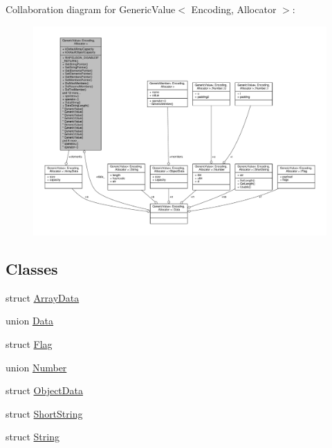 Collaboration diagram for Generic\+Value$<$ Encoding, Allocator $>$\+:
\nopagebreak
\begin{figure}[H]
\begin{center}
\leavevmode
\includegraphics[width=350pt]{classGenericValue__coll__graph}
\end{center}
\end{figure}
\subsection*{Classes}
\begin{DoxyCompactItemize}
\item 
struct \hyperlink{structGenericValue_1_1ArrayData}{Array\+Data}
\item 
union \hyperlink{unionGenericValue_1_1Data}{Data}
\item 
struct \hyperlink{structGenericValue_1_1Flag}{Flag}
\item 
union \hyperlink{unionGenericValue_1_1Number}{Number}
\item 
struct \hyperlink{structGenericValue_1_1ObjectData}{Object\+Data}
\item 
struct \hyperlink{structGenericValue_1_1ShortString}{Short\+String}
\item 
struct \hyperlink{structGenericValue_1_1String}{String}
\end{DoxyCompactItemize}
